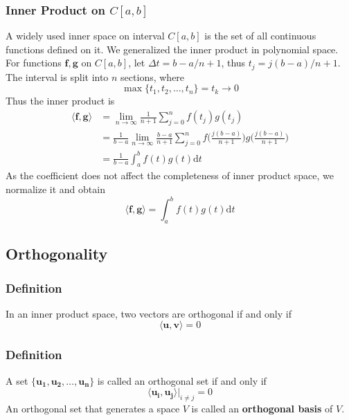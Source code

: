 \documentclass[11pt]{article}
\begin{document}
\subsubsection*{Inner Product on $C[a,b]$}
A widely used inner space on interval $C[a,b]$ is the set of all continuous functions defined on it. We generalized the inner product in polynomial space. For functions $\bm{f}, \bm{g}$ on $C[a,b]$, let $\Delta t = b-a/n+1$, thus $t_j = j(b-a)/n+1$. The interval is split into $n$ sections, where
\begin{equation}
    \max\{t_1,t_2,\dots,t_{n}\} = t_k \rightarrow 0
\end{equation}
Thus the inner product is
\begin{equation}
\begin{aligned}
    \langle \bm{f}, \bm{g} \rangle &= \lim_{n\rightarrow \infty} \frac{1}{n+1} \sum_{j=0}^n f(t_j)g(t_j) \\
    &= \frac{1}{b-a} \lim_{n\rightarrow \infty} \frac{b-a}{n+1}\sum_{j=0}^n f\bigg(\frac{j(b-a)}{n+1}\bigg) g\bigg(\frac{j(b-a)}{n+1}\bigg) \\
    &=\frac{1}{b-a}\int_{a}^b f(t)g(t) \text{d}t
\end{aligned}
\end{equation}
As the coefficient does not affect the completeness of inner product space, we normalize it and obtain
\begin{equation}
    \langle \bm{f},\bm{g} \rangle = \int_{a}^b f(t)g(t) \text{d}t
\end{equation}
\subsection{Orthogonality}
\subsubsection*{Definition} In an inner product space, two vectors are orthogonal if and only if
\begin{equation}
    \langle \bm{u} , \bm{v} \rangle = 0
\end{equation}
\subsubsection*{Definition} A set $\{\bm{u_1},\bm{u_2},\dots,\bm{u_n}\}$ is called an orthogonal set if and only if
\begin{equation}
    \langle \bm{u_i}, \bm{u_j} \rangle \bigg|_{i\neq j} = 0
\end{equation}
An orthogonal set that generates a space $V$ is called an \textbf{orthogonal basis} of $V$.
\end{document}
